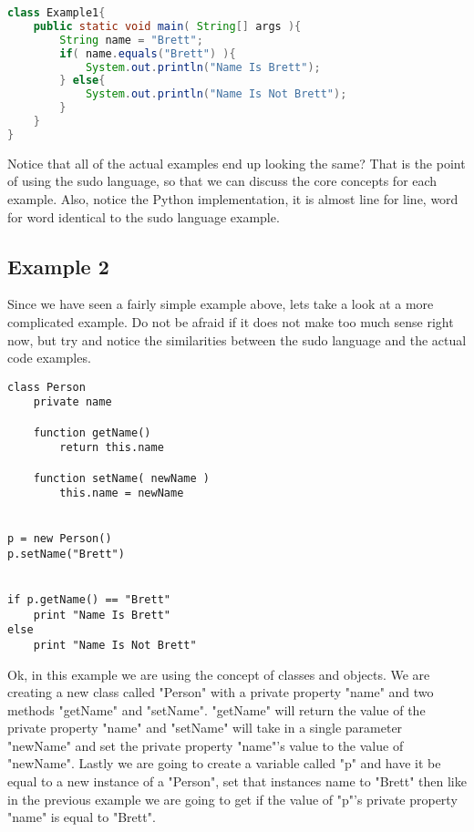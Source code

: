 \begin{lstlisting}[language=java,caption={Example 1 - Java}]
class Example1{
    public static void main( String[] args ){
        String name = "Brett";
        if( name.equals("Brett") ){
            System.out.println("Name Is Brett");
        } else{
            System.out.println("Name Is Not Brett");
        }
    }
}
\end{lstlisting}

Notice that all of the actual examples end up looking the same? That is the point of using the sudo language, so that we can
discuss the core concepts for each example. Also, notice the Python implementation, it is almost line for line, word for word
identical to the sudo language example.

\subsection{Example 2}
Since we have seen a fairly simple example above, lets take a look at a more complicated example. Do not be afraid if it does not make
too much sense right now, but try and notice the similarities between the sudo language and the actual code examples.

\begin{lstlisting}[caption={Example 2 - Sudo Code}]
class Person
    private name
    
    function getName()
        return this.name
    
    function setName( newName )
        this.name = newName


p = new Person()
p.setName("Brett")


if p.getName() == "Brett"
    print "Name Is Brett"
else
    print "Name Is Not Brett"
\end{lstlisting}

Ok, in this example we are using the concept of classes and objects. We are creating a new class called "Person" with a
private property "name" and two methods "getName" and "setName". "getName" will return the value of the private property "name" and
"setName" will take in a single parameter "newName" and set the private property "name"'s value to the value of "newName". Lastly we
are going to create a variable called "p" and have it be equal to a new instance of a "Person", set that instances name to "Brett" then like 
in the previous example we are going to get if the value of "p"'s private property "name" is equal to "Brett".
\par

